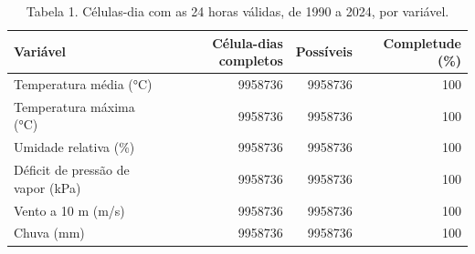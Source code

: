 \begin{table}
\caption{Tabela 1. Células-dia com as 24 horas válidas, de 1990 a 2024, por variável.}
\label{tab:03_clima:xingu:completude}
\begin{tabular}{lrrr}
\toprule
Variável & Célula-dias completos & Possíveis & Completude (\%) \\
\midrule
Temperatura média (°C) & 9958736 & 9958736 & 100 \\
Temperatura máxima (°C) & 9958736 & 9958736 & 100 \\
Umidade relativa (\%) & 9958736 & 9958736 & 100 \\
Déficit de pressão de vapor (kPa) & 9958736 & 9958736 & 100 \\
Vento a 10 m (m/s) & 9958736 & 9958736 & 100 \\
Chuva (mm) & 9958736 & 9958736 & 100 \\
\bottomrule
\end{tabular}
\end{table}
